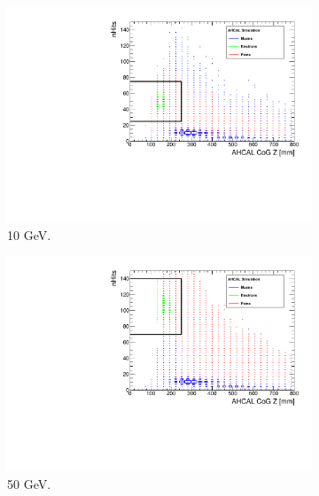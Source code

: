 \begin{figure}[htbp!]
\begin{subfigure}[t]{0.5\textwidth}
		\includegraphics[width=1\linewidth]{../Thesis_Plots/Timing/Electrons/Plots/SelectionCut_nHitsCoGZ_10GeV}
		\caption{10 GeV.} \label{fig:e10GeV_nHitsCoGZ}
	\end{subfigure}
	\hfill
	\begin{subfigure}[t]{0.5\textwidth}
		\centering
		\includegraphics[width=1\linewidth]{../Thesis_Plots/Timing/Electrons/Plots/SelectionCut_nHitsCoGZ_50GeV}
		\caption{50 GeV.} \label{fig:e50GeV_nHitsCoGZ}
	\end{subfigure}
	\hfill
	\begin{subfigure}[t]{0.5\textwidth}
		\centering

\end{subfigure}
\end{figure}
